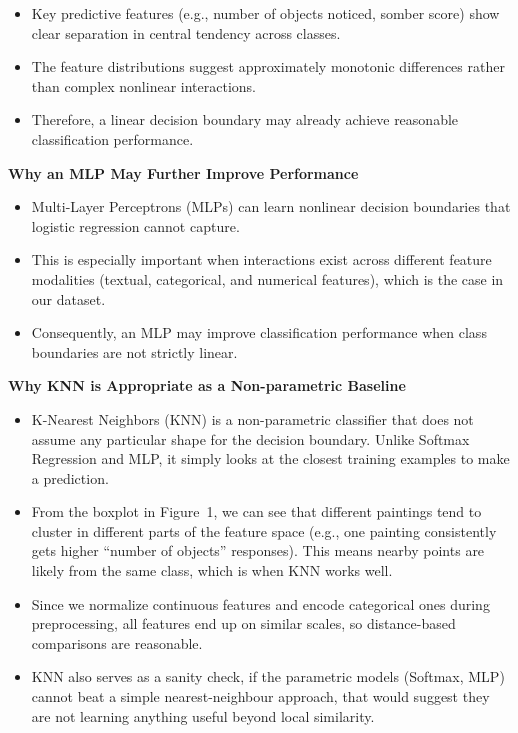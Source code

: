 \documentclass[12pt]{article}
\begin{document}
\begin{itemize}
    \item Key predictive features (e.g., number of objects noticed, somber score) show clear separation in central tendency across classes.
    
    \item The feature distributions suggest approximately monotonic differences rather than complex nonlinear interactions.
    
    \item Therefore, a linear decision boundary may already achieve reasonable classification performance.
\end{itemize}

\textbf{Why an MLP May Further Improve Performance}

\begin{itemize}
    \item Multi-Layer Perceptrons (MLPs) can learn nonlinear decision boundaries that logistic regression cannot capture.
    
    \item This is especially important when interactions exist across different feature modalities (textual, categorical, and numerical features), which is the case in our dataset.
    
    \item Consequently, an MLP may improve classification performance when class boundaries are not strictly linear.
\end{itemize}

\textbf{Why KNN is Appropriate as a Non-parametric Baseline}

\begin{itemize}
    \item K-Nearest Neighbors (KNN) is a non-parametric classifier that does not assume any particular shape for the decision boundary. Unlike Softmax Regression and MLP, it simply looks at the closest training examples to make a prediction.

    \item From the boxplot in Figure~1, we can see that different paintings tend to cluster in different parts of the feature space (e.g., one painting consistently gets higher ``number of objects'' responses). This means nearby points are likely from the same class, which is when KNN works well.

    \item Since we normalize continuous features and encode categorical ones during preprocessing, all features end up on similar scales, so distance-based comparisons are reasonable.

    \item KNN also serves as a sanity check, if the parametric models (Softmax, MLP) cannot beat a simple nearest-neighbour approach, that would suggest they are not learning anything useful beyond local similarity.
\end{itemize}
\end{document}
